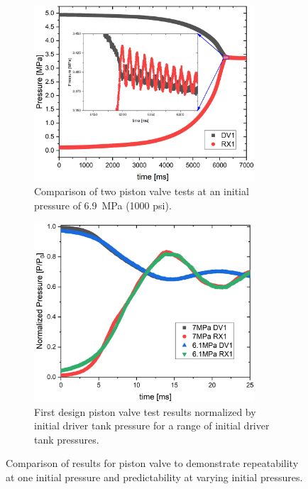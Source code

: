\begin{figure}[bt]
    \vspace{16pt}
    \centering
    \begin{subfigure}[t]{0.45\textwidth}
        \centering
        \includegraphics[width=0.9\textwidth]{results/plots/718psi_MTM_annu_failed_test.png}
        \caption{Comparison of two piston valve tests at an initial pressure of \SI{6.9}{\mega\pascal} (1000 psi).}
        \label{fig:piston 2 test}
    \end{subfigure}
    \hfill
    \begin{subfigure}[t]{0.45\textwidth}
        \centering
        \includegraphics[width=0.9\textwidth]{results/plots/Normalized_RX1_MtM_annular.png}
        \caption{First design piston valve test results normalized by initial driver tank pressure for a range of initial driver tank pressures.}
        \label{fig:norm}
    \end{subfigure}
    \caption{Comparison of results for piston valve to demonstrate repeatability at one initial pressure and predictability at varying initial pressures.}
    \label{fig:piston repeatability}
    \vspace{16pt}
\end{figure}


